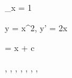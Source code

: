 \lim_{x }  = 1 %

y = x^2, y' = 2x %

\int {} = \log \lvert x \rvert + c %

\subset, \supset, \cup, \cap, \in, \notin, \setminus, \emptyset %
